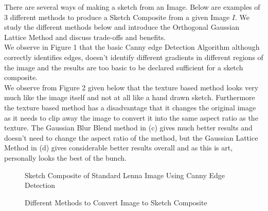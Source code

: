 \documentclass{article}
\begin{document}
There are several ways of making a sketch from an Image. Below are examples of 3 different methods to 
produce a Sketch Composite from a given Image $I$. We study the different methods below and introduce the 
Orthogonal Gaussian Lattice Method and discuss trade-offs and benefits. \\

We observe in Figure 1 that the basic Canny edge Detection Algorithm although correctly identifies edges,
doesn't identify different gradients in different regions of the image and the results are too basic to
be declared sufficient for a sketch composite. \\

We observe from Figure 2 given below that the texture based method looks very much like the image itself 
and not at all like a hand drawn sketch. Furthermore the texture based method has a disadvantage that it 
changes the original image as it needs to clip away the image to convert it into the same aspect ratio as 
the texture. The Gaussian Blur Blend method in (c) gives much better results and doesn't need to change
the aspect ratio of the method, but the Gaussian Lattice Method in (d) gives considerable better results
overall and as this is art, personally looks the best of the bunch.

\begin{figure}[ht]
    \centering
    \qquad
    \caption{Sketch Composite of Standard Lenna Image Using Canny Edge Detection}
    \label{fig:lenna-canny-edge-detection}
\end{figure}

\begin{figure}[ht]
    \centering
    \qquad
    \qquad
    \qquad
    \caption{Different Methods to Convert Image to Sketch Composite}%
    \label{fig:lenna-different-methods}%
\end{figure}
\end{document}

